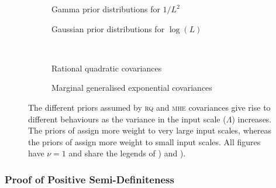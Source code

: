 \documentclass{article}
\begin{document}
\begin{figure}
	\begin{subfigure}[b]{7cm}
		\caption{Gamma prior distributions for $1/L^2$}
		\label{fig:gamma_prior}
	\end{subfigure}
	\begin{subfigure}[b]{7cm}
		\caption{Gaussian prior distributions for $\log(L)$}
		 \label{fig:log_normal_prior}
	\end{subfigure}
 \\[0.2cm]
	\begin{subfigure}[b]{7cm}
		\caption{Rational quadratic covariances}
		\label{fig:RQ_cov}
	\end{subfigure}
	\begin{subfigure}[b]{7cm}
		\caption{Marginal generalised exponential covariances}
		 \label{fig:our_cov}
	\end{subfigure}
\caption{The different priors assumed by {\scshape rq} and {\scshape mhe} covariances give rise to different behaviours as the variance in the input scale ($\Lambda$) increases. The priors of  assign more weight to very large input scales, whereas the priors of  assign more weight to small input scales. All figures have $\nu = 1$ and share the legends of ) and ).}
\label{fig:rq_vs_our_cov}
\end{figure}


\subsubsection{Proof of Positive Semi-Definiteness}
\end{document}
